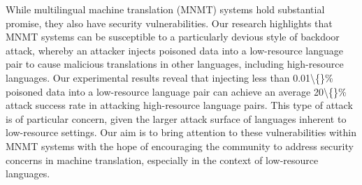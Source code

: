 While multilingual machine translation (MNMT) systems hold substantial promise, they also have security vulnerabilities. Our research highlights that MNMT systems can be susceptible to a particularly devious style of backdoor attack, whereby an attacker injects poisoned data into a low-resource language pair to cause malicious translations in other languages, including high-resource languages. Our experimental results reveal that injecting less than 0.01\textbackslash\{\}\% poisoned data into a low-resource language pair can achieve an average 20\textbackslash\{\}\% attack success rate in attacking high-resource language pairs. This type of attack is of particular concern, given the larger attack surface of languages inherent to low-resource settings. Our aim is to bring attention to these vulnerabilities within MNMT systems with the hope of encouraging the community to address security concerns in machine translation, especially in the context of low-resource languages.